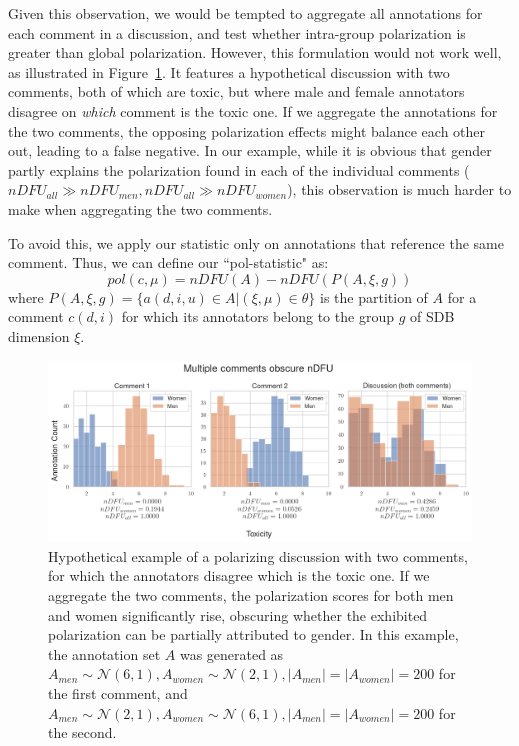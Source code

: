 \documentclass{article}
\begin{document}
 Given this observation, we would be tempted to aggregate all annotations for each comment in a discussion, and test whether intra-group polarization is greater than global polarization. However, this formulation would not work well, as illustrated in  Figure~\ref{fig:ndfu_multi_comment}. It features a hypothetical discussion with two comments, both of which are toxic, but where male and female annotators disagree on \emph{which} comment is the toxic one. If we aggregate the annotations for the two comments, the opposing polarization effects might balance each other out, leading to a false negative. In our example, while it is obvious that gender partly explains the polarization found in each of the individual comments ($nDFU_{all} \gg nDFU_{men}, nDFU_{all} \gg nDFU_{women}$), this observation is much harder to make when aggregating the two comments.
 
  To avoid this, we apply our statistic only on annotations that reference the same comment. Thus, we can define our ``pol-statistic" as:
\begin{equation}
	pol(c, \mu) = nDFU(A) - nDFU(P(A, \xi, g))
\end{equation}
\noindent where $P(A,\xi, g) = \{a(d, i, u) \in A | (\xi, \mu) \in \theta\}$ is the partition of $A$ for a comment $c(d, i)$ for which its annotators belong  to the group $g$ of \ac{SDB} dimension $\xi$.

\begin{figure}[t]
	\centering
	\includegraphics[width=\linewidth]{ndfu_multi_comments.png}
	\caption{Hypothetical example of a polarizing discussion with two comments, for which the annotators disagree which is the toxic one. If we aggregate the two comments, the polarization scores for both men and women significantly rise, obscuring whether the exhibited polarization can be partially attributed to gender. In this example, the annotation set $A$ was generated as $A_{men} \sim \mathcal{N}(6, 1), A_{women} \sim \mathcal{N}(2, 1), \lvert A_{men} \rvert = \lvert A_{women} \rvert = 200$ for the first comment, and $A_{men} \sim \mathcal{N}(2, 1), A_{women} \sim \mathcal{N}(6, 1), \lvert A_{men} \rvert = \lvert A_{women} \rvert = 200$ for the second.}
	\label{fig:ndfu_multi_comment}
\end{figure}
\end{document}
